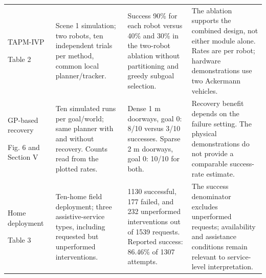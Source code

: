 \begin{table}[!t]
\begin{tabularx}{\linewidth}{@{}L{2.8cm}L{4.3cm}L{4.4cm}Y@{}}
\addlinespace[3pt]
TAPM-IVP~\cite{P_F09}\par Table 2 & Scene 1 simulation; two robots, ten independent trials per method, common local planner/tracker. & Success 90\% for each robot versus 40\% and 30\% in the two-robot ablation without partitioning and greedy subgoal selection. & The ablation supports the combined design, not either module alone. Rates are per robot; hardware demonstrations use two Ackermann vehicles. \\
\addlinespace[3pt]
GP-based recovery~\cite{P_E59}\par Fig. 6 and Section V & Ten simulated runs per goal/world; same planner with and without recovery. Counts read from the plotted rates. & Dense 1 m doorways, goal 0: 8/10 versus 3/10 successes. Sparse 2 m doorways, goal 0: 10/10 for both. & Recovery benefit depends on the failure setting. The physical demonstrations do not provide a comparable success-rate estimate. \\
\addlinespace[3pt]
Home deployment~\cite{P_M37}\par Table 3 & Ten-home field deployment; three assistive-service types, including requested but unperformed interventions. & 1130 successful, 177 failed, and 232 unperformed interventions out of 1539 requests. Reported success: 86.46\% of 1307 attempts. & The success denominator excludes unperformed requests; availability and assistance conditions remain relevant to service-level interpretation. \\
\bottomrule
\end{tabularx}
\end{table}
